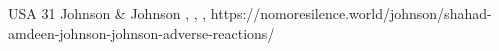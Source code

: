           {USA}
          {31}
          {Johnson \& Johnson}
          {}
          {
            ,
            ,
            ,
          }
          {https://nomoresilence.world/johnson/shahad-amdeen-johnson-johnson-adverse-reactions/}



